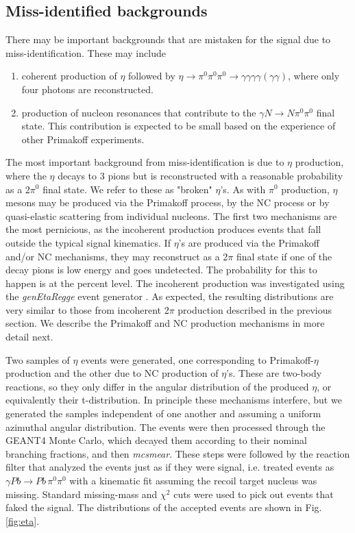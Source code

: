 \subsection{Miss-identified backgrounds}
There may be important backgrounds that are mistaken for the signal due to miss-identification. These may include
\begin{enumerate}[label=(\roman*)]
    \item coherent production of $\eta$ followed by $\eta\rightarrow \pi^0\pi^0\pi^0 \rightarrow \gamma\gamma\gamma\gamma(\gamma\gamma)$, where only four photons are reconstructed.
    \item production of nucleon resonances that contribute to the $\gamma N \rightarrow N \pi^0\pi^0$ final state. This contribution is expected to be small based on the experience of other Primakoff experiments.
\end{enumerate}
The most important background from miss-identification is due to $\eta$ production, where the $\eta$ decays to 3 pions but is reconstructed with a reasonable probability as a 2$\pi^0$ final state. We refer to these as "broken" $\eta$'s. As with $\pi^0$ production, $\eta$ mesons may be produced via the Primakoff process, by the NC process or by quasi-elastic scattering from individual nucleons. The first two mechanisms are the most pernicious, as the incoherent production produces events that fall outside the typical signal kinematics. If $\eta$'s are produced via the Primakoff and/or NC mechanisms, they may reconstruct as a 2$\pi$ final state if one of the decay pions is low energy and goes undetected. The probability for this to happen is at the percent level. The incoherent production was investigated using the {\em genEtaRegge} event generator \cite{hdnote2437}. As expected, the resulting distributions are very similar to those from incoherent 2$\pi$ production described in the previous section. We describe the Primakoff and NC production mechanisms in more detail next.

Two samples of $\eta$ events were generated, one corresponding to Primakoff-$\eta$ production and the other due to NC production of $\eta$'s. These are two-body reactions, so they only differ in the angular distribution of the produced $\eta$, or equivalently their t-distribution. In principle these mechanisms interfere, but we generated the samples independent of one another and assuming a uniform azimuthal angular distribution. The events were then processed through the GEANT4 Monte Carlo, which decayed them according to their nominal branching fractions, and then {\em mcsmear}. These steps were followed by the reaction filter that analyzed the events just as if they were signal, i.e. treated events as $\gamma Pb \rightarrow Pb\, \pi^0 \pi^0$ with a kinematic fit assuming the recoil target nucleus was missing. Standard missing-mass and $\chi^2$ cuts were used to pick out events that faked the signal. The distributions of the accepted events are shown in Fig.\ref{fig:eta}. 

